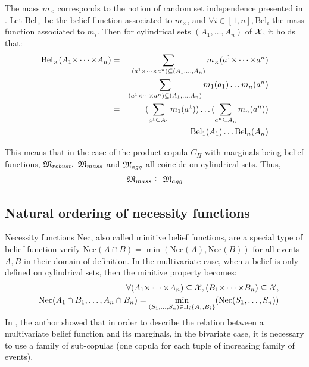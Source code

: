 The mass $m_\times$ corresponds to the notion of random set independence presented in \cite{couso_survey_2000}. Let $\mathrm{Bel}_\times$ be the belief function associated to $m_\times$, and $\forall i\in[1,n], \mathrm{Bel}_i$ the mass function associated to $m_i$. Then for cylindrical sets $(A_1, \dots, A_n)$ of ${\mathcal{X}}$, it holds that:
\begin{eqnarray}
    \mathrm{Bel}_\times(A_1{\times\dots\times} A_n) &=& \sum_{(a^1{\times\dots\times} a^n)\subseteq (A_1, \dots, A_n)}m_\times(a^1{\times\dots\times} a^n)\nonumber\\
    &=& \sum_{(a^1{\times\dots\times} a^n)\subseteq (A_1, \dots, A_n)}m_1(a_1)\dots m_n(a^n)\nonumber\\
    &=& (\sum_{a^1\subseteq A_1}m_1(a^1))\dots(\sum_{a^n\subseteq A_n}m_n(a^n))\nonumber\\
    &=& \mathrm{Bel}_1(A_1)\dots \mathrm{Bel}_n(A_n)
\end{eqnarray}

This means that in the case of the product copula $C_\Pi$ with marginals being belief functions, ${\mathfrak{M}}_{robust},~{\mathfrak{M}}_{mass}$ and ${\mathfrak{M}}_{agg}$ all coincide on cylindrical sets. Thus,
\begin{eqnarray*}
    {\mathfrak{M}}_{mass}\subseteq{\mathfrak{M}}_{agg}
\end{eqnarray*}

\subsection{Natural ordering of necessity functions}\label{subsec:necessity_functions}
Necessity functions $\mathrm{Nec}$, also called minitive belief functions, are a special type of belief function verify $\mathrm{Nec}(A\cap B) =\min(\mathrm{Nec}(A), \mathrm{Nec}(B))$ for all events $A, B$ in their domain of definition. In the multivariate case, when a belief is only defined on cylindrical sets, then the minitive property becomes:
\begin{eqnarray}
    &&\forall (A_1{\times\dots\times} A_n)\subseteq{\mathcal{X}}, (B_1{\times\dots\times} B_n)\subseteq{\mathcal{X}},\nonumber\\
    &&\mathrm{Nec}(A_1\cap B_1,\dots, A_n\cap B_n) = \min_{(S_1,\dots,S_n)\in\Pi_i\{A_i,B_i\}}(\mathrm{Nec}(S_1, \dots, S_n))
\end{eqnarray}
In \cite{schmelzer_joint_2015}, the author showed that in order to describe the relation between a multivariate belief function and its marginals, in the bivariate case, it is necessary to use a family of sub-copulas (one copula for each tuple of increasing family of events).

